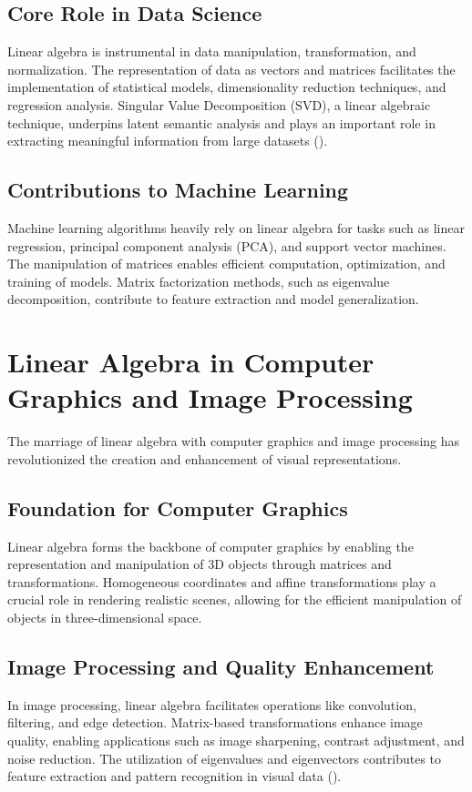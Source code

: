 \subsection{Core Role in Data Science}
Linear algebra is instrumental in data manipulation, transformation, and normalization. The representation of data as vectors and matrices facilitates the implementation of statistical models, dimensionality reduction techniques, and regression analysis. Singular Value Decomposition (SVD), a linear algebraic technique, underpins latent semantic analysis and plays an important role in extracting meaningful information from large datasets (\cite{jones_wang_2020}).

\subsection{Contributions to Machine Learning}
Machine learning algorithms heavily rely on linear algebra for tasks such as linear regression, principal component analysis (PCA), and support vector machines. The manipulation of matrices enables efficient computation, optimization, and training of models. Matrix factorization methods, such as eigenvalue decomposition, contribute to feature extraction and model generalization.

\newpage
\thispagestyle{plain}

\section{Linear Algebra in Computer Graphics and Image Processing}
The marriage of linear algebra with computer graphics and image processing has revolutionized the creation and enhancement of visual representations.

\subsection{Foundation for Computer Graphics}
Linear algebra forms the backbone of computer graphics by enabling the representation and manipulation of 3D objects through matrices and transformations. Homogeneous coordinates and affine transformations play a crucial role in rendering realistic scenes, allowing for the efficient manipulation of objects in three-dimensional space.

\subsection{Image Processing and Quality Enhancement}
In image processing, linear algebra facilitates operations like convolution, filtering, and edge detection. Matrix-based transformations enhance image quality, enabling applications such as image sharpening, contrast adjustment, and noise reduction. The utilization of eigenvalues and eigenvectors contributes to feature extraction and pattern recognition in visual data (\cite{williams_zhang_2019}).

